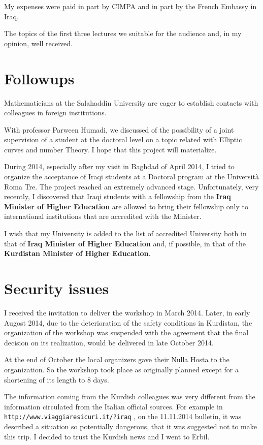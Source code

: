 \documentclass[12pt,a4paper]{scrartcl}
\begin{document}
My expenses were paid in part by CIMPA and in part by the French Embassy in Iraq.

The topics of the first three lectures we suitable for the audience and, in my opinion, well received.


 \vfill\pagebreak
{}

\section{Followups}

Mathematicians at the Salahaddin University are eager to establish contacts with colleagues in foreign institutions. 

With professor Parween Humadi, we discussed of the possibility of a joint supervision
of a student at the doctoral level on a topic related with Elliptic curves and number Theory. I hope that this project
will materialize.

During 2014, especially after my visit in Baghdad of April 2014, I tried to organize the acceptance of Iraqi students
at a Doctoral program at the Università Roma Tre. The project reached an extremely advanced stage. Unfortunately, very recently,
I discovered that Iraqi students with a fellowship from the \textbf{Iraq Minister of Higher Education} are allowed to bring
their fellowship only to international institutions that are accredited with the Minister. 

I wish that my University is added to the list of accredited University both in that of \textbf{Iraq Minister of Higher Education} 
and, if possible, in that of the \textbf{Kurdistan Minister of Higher Education}.

\section{Security issues}

I received the invitation to deliver the workshop in March 2014. Later, in early Augost 2014, due to the deterioration of the safety
conditions in Kurdistan, 
the organization of the workshop was suspended with the agreement that the final decision on its realization,
would be delivered in late October 2014.

At the end of October the local organizers gave their Nulla Hosta to the organization. So the workshop took place as originally planned except for
a shortening of its length to 8 days.

The information coming from the Kurdish colleagues was very different from the information circulated from  the Italian
official sources. For example in
\texttt{http://www.viaggiaresicuri.it/?iraq} , on the 11.11.2014 bulletin, it was described a situation so potentially
dangerous, that it was suggested not to make this trip. I decided to trust the Kurdish 
news and I went to Erbil.
\end{document}
